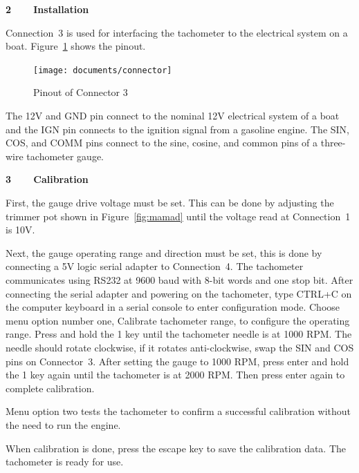 {\large\textbf{2~~~~Installation}}

Connection~3 is used for interfacing the tachometer to the electrical system on a boat. Figure~\ref{fig:boatcond} shows the pinout.

\begin{figure}[H]
    \centering
    \texttt{[image: documents/connector]}
    \caption{Pinout of Connector 3}
    \label{fig:boatcond}
\end{figure}

The 12V and GND pin connect to the nominal 12V electrical system of a boat and the IGN pin connects to the ignition signal from a gasoline engine. The SIN, COS, and COMM pins connect to the sine, cosine, and common pins of a three-wire  tachometer gauge.

{\large\textbf{3~~~~Calibration}}

First, the  gauge drive voltage must be set. This can be done by adjusting the trimmer pot shown in Figure~\ref{fig:mamad} until the voltage read at Connection~1 is 10V.

Next, the  gauge operating range and direction must be set, this is done by connecting a 5V logic serial adapter to Connection~4. The tachometer communicates using RS232 at 9600 baud with 8-bit words and one stop bit. After connecting the serial adapter and powering on the tachometer, type CTRL+C on the computer keyboard in a serial console to enter configuration mode. Choose menu option number one, Calibrate tachometer range, to configure the operating range. Press and hold the 1 key until the tachometer needle is at 1000 RPM. The needle should rotate clockwise, if it rotates anti-clockwise, swap the SIN and COS pins on Connector~3. After setting the gauge to 1000 RPM, press enter and hold the 1 key again until the tachometer is at 2000 RPM. Then press enter again to complete calibration.

Menu option two tests the tachometer to confirm a successful calibration without the need to run the engine.

When calibration is done, press the escape key to save the calibration data. The tachometer is ready for use.

